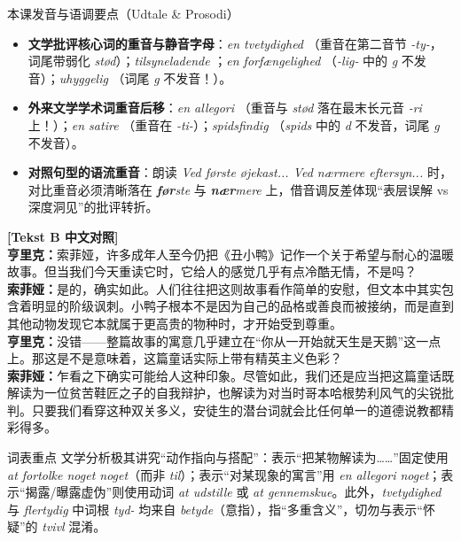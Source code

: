 \begin{tipbox}{本课发音与语调要点（Udtale \& Prosodi）}
\begin{itemize}
  \item \textbf{文学批评核心词的重音与静音字母}：\textit{en tvetydighed} （重音在第二音节 \textit{-ty-}，词尾带弱化 \textit{stød}）；\textit{tilsyneladende} ；\textit{en forfængelighed} （\textit{-lig-} 中的 \textit{g} 不发音）；\textit{uhyggelig} （词尾 \textit{g} 不发音！）。
  \item \textbf{外来文学学术词重音后移}：\textit{en allegori} （重音与 \textit{stød} 落在最末长元音 \textit{-ri} 上！）；\textit{en satire} （重音在 \textit{-ti-}）；\textit{spidsfindig} （\textit{spids} 中的 \textit{d} 不发音，词尾 \textit{g} 不发音）。
  \item \textbf{对照句型的语流重音}：朗读 \textit{Ved første øjekast... Ved nærmere eftersyn...} 时，对比重音必须清晰落在 \textit{\textbf{før}ste} 与 \textit{\textbf{nær}mere} 上，借音调反差体现“表层误解 vs 深度洞见”的批评转折。
\end{itemize}
\end{tipbox}

\begin{transbox}
\small
\textbf{\color{NCDTeal}[Tekst B 中文对照]}\\
\textbf{亨里克：}索菲娅，许多成年人至今仍把《丑小鸭》记作一个关于希望与耐心的温暖故事。但当我们今天重读它时，它给人的感觉几乎有点冷酷无情，不是吗？\\
\textbf{索菲娅：}是的，确实如此。人们往往把这则故事看作简单的安慰，但文本中其实包含着明显的阶级讽刺。小鸭子根本不是因为自己的品格或善良而被接纳，而是直到其他动物发现它本就属于更高贵的物种时，才开始受到尊重。\\
\textbf{亨里克：}没错——整篇故事的寓意几乎建立在“你从一开始就天生是天鹅”这一点上。那这是不是意味着，这篇童话实际上带有精英主义色彩？\\
\textbf{索菲娅：}乍看之下确实可能给人这种印象。尽管如此，我们还是应当把这篇童话既解读为一位贫苦鞋匠之子的自我辩护，也解读为对当时哥本哈根势利风气的尖锐批判。只要我们看穿这种双关多义，安徒生的潜台词就会比任何单一的道德说教都精彩得多。
\end{transbox}


\begin{tipbox}{词表重点}
文学分析极其讲究“动作指向与搭配”：表示“把某物解读为……”固定使用 \textit{at fortolke noget  noget}（而非 \textit{til}）；表示“对某现象的寓言”用 \textit{en allegori  noget}；表示“揭露/曝露虚伪”则使用动词 \textit{at udstille} 或 \textit{at gennemskue}。此外，\textit{tvetydighed} 与 \textit{flertydig} 中词根 \textit{tyd-} 均来自 \textit{betyde}（意指），指“多重含义”，切勿与表示“怀疑”的 \textit{tvivl} 混淆。
\end{tipbox}

